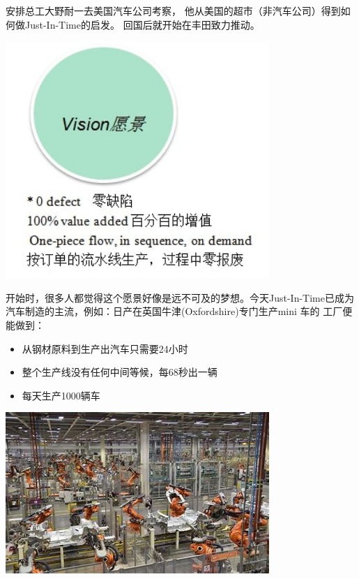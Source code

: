 \begin{description}
\item[]
\end{description}

安排总工大野耐一去美国汽车公司考察，
他从美国的超市（非汽车公司）得到如何做Just-In-Time的启发。
回国后就开始在丰田致力推动。


\includegraphics[width=10cm]{远景1.jpg}

开始时，很多人都觉得这个愿景好像是远不可及的梦想。今天Just-In-Time已成为汽车制造的主流，例如：日产在英国牛津(Oxfordshire)专门生产mini
车的 工厂便能做到：

\begin{itemize}
\tightlist
\item
  从钢材原料到生产出汽车只需要24小时
\item
  整个生产线没有任何中间等候，每68秒出一辆
\item
  每天生产1000辆车
\end{itemize}

\includegraphics[width=10cm]{NissanRobots-OIP_h8UAC7FBjlaCmA_mBepJjQHaEi.jpg}

